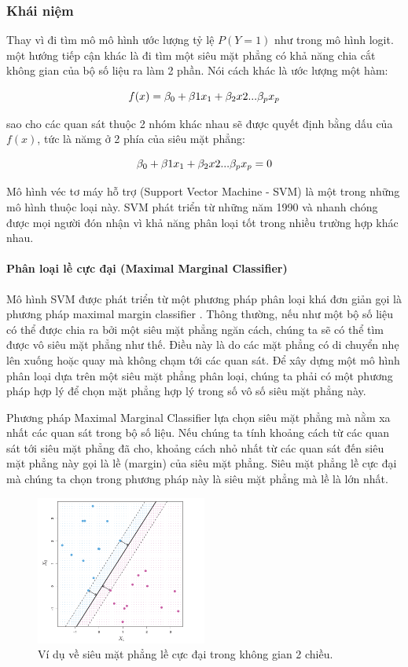 \subsubsection{Khái niệm}
Thay vì đi tìm mô mô hình ước lượng tỷ lệ $P(Y =1)$ như trong mô hình logit. một hướng tiếp cận khác là đi tìm một siêu mặt phẳng có khả năng chia cắt không gian của bộ số liệu ra làm 2 phần. Nói cách khác là ước lượng một hàm:

$$
\large
f(x) = \beta_0 + \beta1 x_1 + \beta_2 x2 ...\beta_p x_p
$$

sao cho các quan sát thuộc 2 nhóm khác nhau sẽ được quyết định bằng dấu của $f(x)$, tức là nămg ở 2 phía của siêu mặt phẳng:

$$
\large
\beta_0 + \beta1 x_1 + \beta_2 x2 ...\beta_p x_p = 0
$$

Mô hình véc tơ máy hỗ trợ (Support Vector Machine - SVM) là một trong những mô hình thuộc loại này. SVM phát triển từ những năm 1990 và nhanh chóng được mọi người đón nhận vì khả năng phân loại tốt trong nhiều trường hợp khác nhau.

\paragraph{Phân loại lề cực đại (Maximal Marginal Classifier)}
Mô hình SVM được phát triển từ một phương pháp phân loại khá đơn giản gọi là phương pháp maximal margin classifier \parencite{boser1992training}. Thông thường, nếu như một bộ số liệu có thể được chia ra bởi một siêu mặt phẳng ngăn cách, chúng ta sẽ có thể tìm được vô siêu mặt phẳng như thế. Điều này là do các mặt phẳng có di chuyển nhẹ lên xuống hoặc quay mà không chạm tới các quan sát. Để xây dựng một mô hình phân loại dựa trên một siêu mặt phẳng phân loại,  chúng ta phải có một phương pháp hợp lý để chọn mặt phẳng hợp lý trong số vô số siêu mặt phẳng này.

Phương pháp Maximal Marginal Classifier lựa chọn siêu mặt phẳng mà nằm xa nhất các quan sát trong bộ số liệu. Nếu chúng ta tính khoảng cách từ các quan sát tới siêu mặt phẳng đã cho, khoảng cách nhỏ nhất từ các quan sát đến siêu mặt phẳng này gọi là lề (margin) của siêu mặt phẳng. Siêu mặt phẳng lề cực đại mà chúng ta chọn trong phương pháp này là siêu mặt phẳng mà lề là lớn nhất.

\begin{figure}
  \centering
   \includegraphics[width=0.5\textwidth]{./Figures/maxim_margin_example.png}
   \caption{Ví dụ về siêu mặt phẳng lề cực đại trong không gian 2 chiều.}
   \label{fig:maxim_margin_example}
\end{figure}

